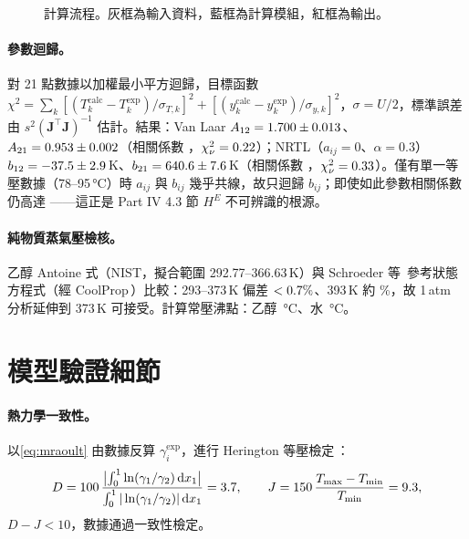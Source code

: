 \documentclass[UTF8,a4paper,11pt,fontset=none,zihao=-4]{ctexart}
\numberwithin{equation}{section}\renewcommand{\theequation}{\arabic{section}.\arabic{equation}}
\numberwithin{figure}{section}\renewcommand{\thefigure}{\arabic{section}.\arabic{figure}}
\numberwithin{table}{section}\renewcommand{\thetable}{\arabic{section}.\arabic{table}}
\newcommand{\dd}{\mathrm{d}}
\begin{document}
\begin{figure}[H]
\centering

\caption{計算流程。灰框為輸入資料，藍框為計算模組，紅框為輸出。}\label{fig:workflow}
\end{figure}

\paragraph{參數迴歸。}對 21 點數據以加權最小平方迴歸，目標函數
$\chi^2=\sum_k[(T_k^{\mathrm{calc}}-T_k^{\mathrm{exp}})/\sigma_{T,k}]^2+[(y_k^{\mathrm{calc}}-y_k^{\mathrm{exp}})/\sigma_{y,k}]^2$，$\sigma=U/2$，標準誤差由 $s^2(\mathbf J^\top\mathbf J)^{-1}$ 估計。結果：Van Laar $A_{12}=1.700\pm0.013$、$A_{21}=0.953\pm0.002$（相關係數 \nvlCorr，$\chi^2_\nu=0.22$）；NRTL（$a_{ij}=0$、$\alpha=0.3$）$b_{12}=-37.5\pm2.9$\,K、$b_{21}=640.6\pm7.6$\,K（相關係數 \nnrCorr，$\chi^2_\nu=0.33$）。僅有單一等壓數據（78--95\,°C）時 $a_{ij}$ 與 $b_{ij}$ 幾乎共線，故只迴歸 $b_{ij}$；即使如此參數相關係數仍高達 \nnrCorr——這正是 Part IV 4.3 節 $H^{E}$ 不可辨識的根源。

\paragraph{純物質蒸氣壓檢核。}乙醇 Antoine 式（NIST，擬合範圍 292.77--366.63\,K）與 Schroeder 等\,\cite{schroeder} 參考狀態方程式（經 CoolProp\,\cite{coolprop}）比較：293--373\,K 偏差 $<0.7\%$、393\,K 約 \npsatDevHi\%，故 1\,atm 分析延伸到 373\,K 可接受。計算常壓沸點：乙醇 \nTbEtOH\,°C、水 \nTbWater\,°C。

\section{模型驗證細節}\label{app:validation}
\paragraph{熱力學一致性。}以\cref{eq:mraoult} 由數據反算 $\gamma_i^{\exp}$，進行 Herington 等壓檢定\,\cite{herington}：
\begin{equation}
D=100\,\frac{\bigl|\int_0^1\ln(\gamma_1/\gamma_2)\,\dd x_1\bigr|}{\int_0^1|\ln(\gamma_1/\gamma_2)|\,\dd x_1}=\nherD,\qquad J=150\,\frac{T_{\max}-T_{\min}}{T_{\min}}=\nherJ,
\end{equation}
$D-J<10$，數據通過一致性檢定。
\end{document}
